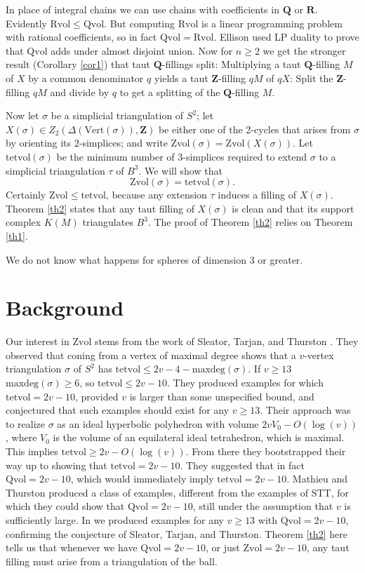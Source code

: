 \documentclass[12pt]{article}
\def\ZZ{\mathbf{Z}}
\def\QQ{\mathbf{Q}}
\def\RR{\mathbf{R}}
\newcommand{\kw}{\mathrm}
\newcommand{\maxdeg}{\kw{maxdeg}}
\newcommand{\vertices}{\kw{Vert}}
\newcommand{\Zvol}{\kw{Zvol}}
\newcommand{\Qvol}{\kw{Qvol}}
\newcommand{\Rvol}{\kw{Rvol}}
\newcommand{\tetvol}{\kw{tetvol}}
\begin{document}
In place of integral chains we can use chains with
coefficients in $\QQ$ or $\RR$.
Evidently $\Rvol \leq \Qvol$.
But computing $\Rvol$ is
a linear programming problem with rational coefficients,
so in fact $\Qvol = \Rvol$.
Ellison used LP duality to prove that
$\Qvol$ adds under almost
disjoint union.
Now for $n \geq 2$ we get the stronger result
(Corollary \ref{cor1})
that taut $\QQ$-fillings split:
Multiplying a taut
$\QQ$-filling $M$ of $X$ by a common denominator $q$
yields a taut $\ZZ$-filling $qM$ of $qX$:
Split the $\ZZ$-filling $qM$ and divide by $q$ to get a splitting
of the $\QQ$-filling $M$.

Now let $\sigma$ be a simplicial triangulation of $S^2$;
let $X(\sigma) \in Z_2(\Delta(\vertices(\sigma)),\ZZ)$
be either one of the 2-cycles
that arises from $\sigma$ by orienting its $2$-simplices;
and write $\Zvol(\sigma) = \Zvol(X(\sigma))$.
Let $\tetvol(\sigma)$ be the minimum number of $3$-simplices
required to extend $\sigma$ to a simplicial triangulation $\tau$ of $B^3$.
We will show that
\[
\Zvol(\sigma) = \tetvol(\sigma)
.
\]
Certainly $\Zvol \leq \tetvol$,
because any extension $\tau$ induces a filling
of $X(\sigma)$.
Theorem \ref{th2} states that any taut filling of $X(\sigma)$ is clean
and that its support complex $K(M)$ triangulates $B^3$.
The proof of Theorem \ref{th2} relies on Theorem \ref{th1}.

We do not know what happens for spheres of dimension 3 or greater.

\section{Background}

Our interest in $\Zvol$ stems from the work
of Sleator, Tarjan, and Thurston
\cite{stt:jams}.
They observed that coning from a vertex of maximal degree
shows that a $v$-vertex
triangulation $\sigma$
of $S^2$ has $\tetvol \leq 2v-4-\maxdeg(\sigma)$.
If $v\geq13$ $\maxdeg(\sigma) \geq 6$, so $\tetvol \leq 2v-10$.
They
produced examples for which $\tetvol = 2v-10$, provided
$v$ is larger than some unspecified bound,
and conjectured that such examples should exist for any $v \geq 13$.
Their approach was to 
realize $\sigma$ as an ideal hyperbolic polyhedron
with volume $2v V_0-O(\log(v))$,
where $V_0$ is the volume of an
equilateral ideal tetrahedron,
which is maximal.
This implies $\tetvol \geq 2v-O(\log(v))$.
From there they bootstrapped their way up to showing
that $\tetvol=2v-10$.
They suggested
\cite[p. 697]{stt:jams}
that in fact $\Qvol= 2v-10$,
which would immediately imply $\tetvol=2v-10$.
Mathieu and Thurston \cite{mt}
produced a class of examples,
different from the examples of STT,
for which they could show that $\Qvol = 2v-10$,
still under the assumption that $v$
is sufficiently large.
In \cite{dew:filling} we produced examples for any $v \geq 13$ with
$\Qvol=2v-10$, confirming the conjecture of Sleator, Tarjan, and Thurston.
Theorem \ref{th2} here
tells us that whenever we have $\Qvol=2v-10$,
or just $\Zvol=2v-10$, any taut filling
must arise from a triangulation of the ball.
\end{document}
